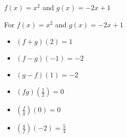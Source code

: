 {$f(x) = x^2$ and $g(x) = -2x+1$}
{For  $f(x) = x^2$ and $g(x) = -2x+1$

\begin{multicols}{2}
\begin{itemize}
\item  $(f+g)(2) = 1$
\item  $(f-g)(-1) = -2$
\item  $(g-f)(1) = -2$
\item  $(fg)\left(\frac{1}{2}\right) = 0$
\item  $\left(\frac{f}{g}\right)(0) = 0$
\item  $\left(\frac{g}{f}\right)\left(-2\right) = \frac{5}{4}$

\end{itemize}
\end{multicols}
}